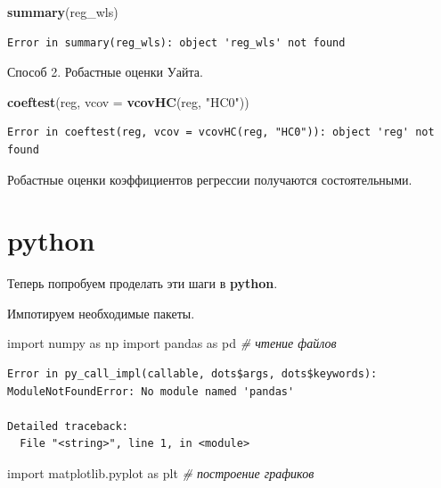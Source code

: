 \documentclass[]{book}
\newenvironment{Shaded}{\begin{snugshade}}{\end{snugshade}}
\newcommand{\CommentTok}[1]{\textcolor[rgb]{0.56,0.35,0.01}{\textit{#1}}}
\newcommand{\DataTypeTok}[1]{\textcolor[rgb]{0.13,0.29,0.53}{#1}}
\newcommand{\ImportTok}[1]{#1}
\newcommand{\KeywordTok}[1]{\textcolor[rgb]{0.13,0.29,0.53}{\textbf{#1}}}
\newcommand{\NormalTok}[1]{#1}
\newcommand{\StringTok}[1]{\textcolor[rgb]{0.31,0.60,0.02}{#1}}
\begin{document}
\begin{Shaded}
\begin{Highlighting}[]
\KeywordTok{summary}\NormalTok{(reg_wls)}
\end{Highlighting}
\end{Shaded}

\begin{verbatim}
Error in summary(reg_wls): object 'reg_wls' not found
\end{verbatim}

Способ 2. Робастные оценки Уайта.

\begin{Shaded}
\begin{Highlighting}[]
\KeywordTok{coeftest}\NormalTok{(reg, }\DataTypeTok{vcov =} \KeywordTok{vcovHC}\NormalTok{(reg, }\StringTok{"HC0"}\NormalTok{))}
\end{Highlighting}
\end{Shaded}

\begin{verbatim}
Error in coeftest(reg, vcov = vcovHC(reg, "HC0")): object 'reg' not found
\end{verbatim}

Робастные оценки коэффициентов регрессии получаются состоятельными.

\hypertarget{python-3}{%
\section{python}\label{python-3}}

Теперь попробуем проделать эти шаги в \textbf{python}.

Импотируем необходимые пакеты.

\begin{Shaded}
\begin{Highlighting}[]
\ImportTok{import}\NormalTok{ numpy }\ImportTok{as}\NormalTok{ np}
\ImportTok{import}\NormalTok{ pandas }\ImportTok{as}\NormalTok{ pd }\CommentTok{# чтение файлов}
\end{Highlighting}
\end{Shaded}

\begin{verbatim}
Error in py_call_impl(callable, dots$args, dots$keywords): ModuleNotFoundError: No module named 'pandas'

Detailed traceback: 
  File "<string>", line 1, in <module>
\end{verbatim}

\begin{Shaded}
\begin{Highlighting}[]
\ImportTok{import}\NormalTok{ matplotlib.pyplot }\ImportTok{as}\NormalTok{ plt }\CommentTok{# построение графиков}
\end{Highlighting}
\end{Shaded}
\end{document}
